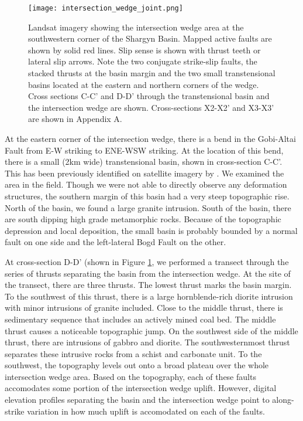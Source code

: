 \begin{figure}[h!]
  \centering
  \texttt{[image: intersection\_wedge\_joint.png]}
  \caption{Landsat imagery showing the intersection wedge area at the southwestern corner of the Shargyn Basin. Mapped active faults are shown by solid red lines. Slip sense is shown with thrust teeth or lateral slip arrows. Note the two conjugate strike-slip faults, the stacked thrusts at the basin margin and the two small transtensional basins located at the eastern and northern corners of the wedge. Cross sections C-C' and D-D' through the transtensional basin and the intersection wedge are shown. Cross-sections X2-X2' and X3-X3' are shown in Appendix A.}
  \label{intersection_wedge_joint}
\end{figure}

At the eastern corner of the intersection wedge, there is a bend in the Gobi-Altai Fault from E-W striking to ENE-WSW striking. At the location of this bend, there is a small (2km wide) transtensional basin, shown in cross-section C-C'. This has been previously identified on satellite imagery by \citet{Cunningham2010}. We examined the area in the field. Though we were not able to directly observe any deformation structures, the southern margin of this basin had a very steep topographic rise. North of the basin, we found a large granite intrusion. South of the basin, there are south dipping high grade metamorphic rocks. Because of the topographic depression and local deposition, the small basin is probably bounded by a normal fault on one side and the left-lateral Bogd Fault on the other. 

At cross-section D-D' (shown in Figure \ref{intersection_wedge_joint}, we performed a transect through the series of thrusts separating the basin from the intersection wedge. At the site of the transect, there are three thrusts. The lowest thrust marks the basin margin. To the southwest of this thrust, there is a large hornblende-rich diorite intrusion with minor intrusions of granite included. Close to the middle thrust, there is sedimentary sequence that includes an actively mined coal bed. The middle thrust causes a noticeable topographic jump. On the southwest side of the middle thrust, there are intrusions of gabbro and diorite. The southwesternmost thrust separates these intrusive rocks from a schist and carbonate unit. To the southwest, the topography levels out onto a broad plateau over the whole intersection wedge area. Based on the topography, each of these faults accomodates some portion of the intersection wedge uplift. However, digital elevation profiles separating the basin and the intersection wedge point to along-strike variation in how much uplift is accomodated on each of the faults. 

